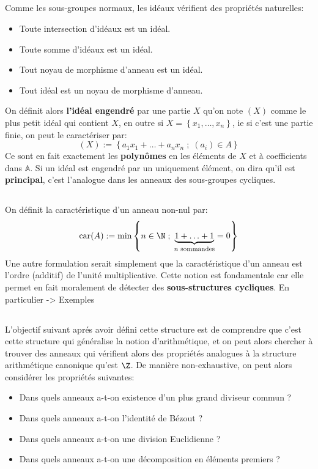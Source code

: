 \subsection*{}
Comme les sous-groupes normaux, les idéaux vérifient des propriétés naturelles:
\begin{itemize}
   \item Toute intersection d'idéaux est un idéal.
   \item Toute somme d'idéaux est un idéal.
   \item Tout noyau de morphisme d'anneau est un idéal.
   \item Tout idéal est un noyau de morphisme d'anneau.
\end{itemize}
On définit alors \textbf{l'idéal engendré} par une partie \(X\) qu'on note \( (X) \) comme le plus petit idéal qui contient \( X \), en outre si \( X = \left\{ x_1, \ldots, x_n \right\}  \), ie si c'est une partie finie, on peut le caractériser par:
\[ 
   (X) := \left\{ a_1x_1 + \ldots + a_nx_n \; ; \; (a_i) \in A \right\}  
\]
Ce sont en fait exactement les \textbf{polynômes} en les éléments de \( X \) et à coefficients dans \( \mathbb{A} \). Si un idéal est engendré par un uniquement élément, on dira qu'il est \textbf{principal}, c'est l'analogue dans les anneaux des sous-groupes cycliques.
\subsection*{}
On définit la caractéristique d'un anneau non-nul par:
\[
   \text{car}(A) := \min \left\{ n \in \N \; ; \;\underbrace{1 + \ldots + 1}_{\text{\(n\) sommandes}} = 0 \right\}
\]
Une autre formulation serait simplement que la caractéristique d'un anneau est l'ordre (additif) de l'unité multiplicative. Cette notion est fondamentale car elle permet en fait moralement de détecter des \textbf{sous-structures cycliques}. En particulier -> Exemples
\subsection*{}
L'objectif suivant aprés avoir défini cette structure est de comprendre que c'est cette structure qui généralise la notion d'arithmétique, et on peut alors chercher à trouver des anneaux qui vérifient alors des propriétés analogues à la structure arithmétique canonique qu'est \( \Z \). De manière non-exhaustive, on peut alors considérer les propriétés suivantes:
\begin{itemize}
   \item Dans quels anneaux a-t-on existence d'un plus grand diviseur commun ?
   \item Dans quels anneaux a-t-on l'identité de Bézout ?
   \item Dans quels anneaux a-t-on une division Euclidienne ?
   \item Dans quels anneaux a-t-on une décomposition en éléments premiers ?
\end{itemize}

